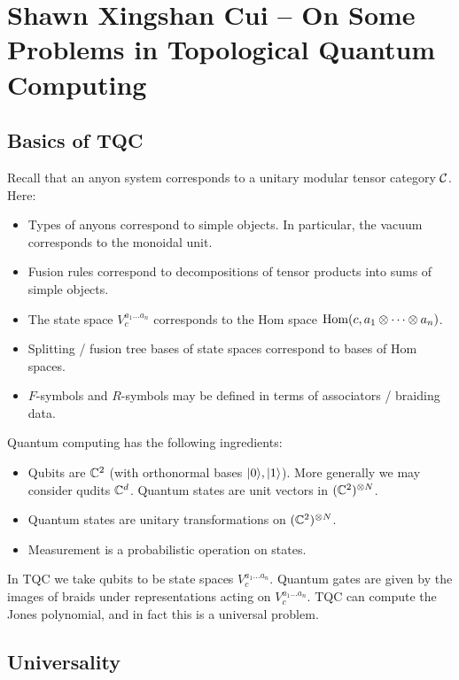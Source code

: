 \documentclass{amsart}
\begin{document}
\section{Shawn Xingshan Cui -- On Some Problems in Topological Quantum Computing}

\subsection{Basics of TQC}

Recall that an anyon system corresponds to a unitary modular tensor category $\mathcal{C}$.
Here:
\begin{itemize}
  \item Types of anyons correspond to simple objects.
    In particular, the vacuum corresponds to the monoidal unit.
  \item Fusion rules correspond to decompositions of tensor products into sums of simple objects.
  \item The state space $V^{a_1 \dots a_n}_{c}$ corresponds to the Hom space $\operatorname{Hom}(c, a_1 \otimes \dots \otimes a_n)$.
  \item Splitting / fusion tree bases of state spaces correspond to bases of Hom spaces.
  \item $F$-symbols and $R$-symbols may be defined in terms of associators / braiding data.
\end{itemize}

Quantum computing has the following ingredients:
\begin{itemize}
  \item Qubits are $\mathbb{C}^2$ (with orthonormal bases $\lvert0\rangle, \lvert1\rangle$).
    More generally we may consider qudits $\mathbb{C}^d$.
    Quantum states are unit vectors in $(\mathbb{C}^2)^{\otimes N}$.
  \item Quantum states are unitary transformations on $(\mathbb{C}^2)^{\otimes N}$.
  \item Measurement is a probabilistic operation on states.
\end{itemize}

In TQC we take qubits to be state spaces $V^{a_1 \dots a_n}_c$.
Quantum gates are given by the images of braids under representations acting on $V^{a_1 \dots a_n}_c$.
TQC can compute the Jones polynomial, and in fact this is a universal problem.

\subsection{Universality}
\end{document}

